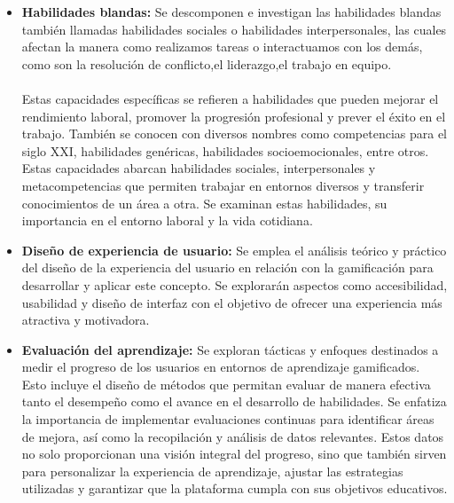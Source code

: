 \begin{itemize}
    \item \textbf{Habilidades blandas:}
 Se descomponen e investigan las habilidades blandas también llamadas habilidades sociales o habilidades interpersonales, las cuales afectan la manera como realizamos tareas o interactuamos con los demás, como son la resolución de conflicto,el liderazgo,el trabajo en equipo. 
 \\ \\
Estas capacidades específicas se refieren a habilidades que pueden mejorar el rendimiento laboral, promover la progresión profesional y prever el éxito en el trabajo. También se conocen con diversos nombres como competencias para el siglo XXI, habilidades genéricas, habilidades socioemocionales, entre otros. Estas capacidades abarcan habilidades sociales, interpersonales y metacompetencias que permiten trabajar en entornos diversos y transferir conocimientos de un área a otra.\cite{h} Se examinan estas habilidades, su importancia en el entorno laboral y la vida cotidiana.

\end{itemize}

\begin{itemize}
    \item \textbf{Diseño de experiencia de usuario:}
Se emplea el análisis teórico y práctico del diseño de la experiencia del usuario en relación con la gamificación para desarrollar y aplicar este concepto. Se explorarán aspectos como accesibilidad, usabilidad y diseño de interfaz con el objetivo de ofrecer una experiencia más atractiva y motivadora. 
\end{itemize}

\begin{itemize}
    \item \textbf{Evaluación del aprendizaje:}  Se exploran tácticas y enfoques destinados a medir el progreso de los usuarios en entornos de aprendizaje gamificados. Esto incluye el diseño de métodos que permitan evaluar de manera efectiva tanto el desempeño como el avance en el desarrollo de habilidades. Se enfatiza la importancia de implementar evaluaciones continuas para identificar áreas de mejora, así como la recopilación y análisis de datos relevantes. Estos datos no solo proporcionan una visión integral del progreso, sino que también sirven para personalizar la experiencia de aprendizaje, ajustar las estrategias utilizadas y garantizar que la plataforma cumpla con sus objetivos educativos.

\end{itemize}


